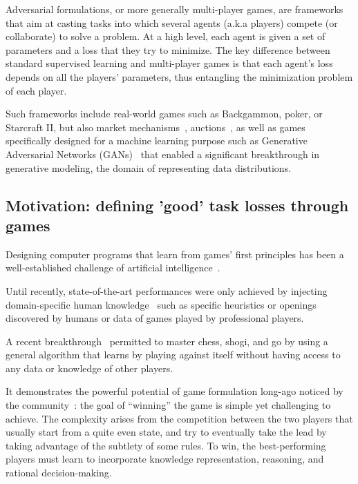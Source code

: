Adversarial formulations, or more generally multi-player games, are frameworks that aim at casting tasks into which several agents (a.k.a players) compete (or collaborate) to solve a problem. At a high level, each agent is given a set of parameters and a loss that they try to minimize. The key difference between standard supervised learning and multi-player games is that each agent’s loss depends on all the players' parameters, thus entangling the minimization problem of each player. 







Such frameworks include real-world games such as Backgammon, poker, or Starcraft II, but also market mechanisms~\citep{nisan2007introduction}, auctions~\citep{vickrey1961counterspeculation}, as well as games specifically designed for a machine learning purpose such as Generative Adversarial Networks (GANs)~\citep{goodfellow2014generative} that enabled a significant breakthrough in generative modeling, the domain of representing data distributions.







\subsection{Motivation: defining ’good’ task losses through games}




Designing computer programs that learn from games' first principles has been a well-established challenge of artificial intelligence~\citep{samuel1959some,tesauro1995temporal}.

Until recently, state-of-the-art performances were only achieved by injecting domain-specific human knowledge~\citep{campbell2002deep,genesereth2005general,silver2016mastering} such as specific heuristics or openings discovered by humans or data of games played by professional players. 




A recent breakthrough~\citep{silver2018general} permitted to master chess, shogi, and go by using a general algorithm that learns by playing against itself without having access to any data or knowledge of other players. 




It demonstrates the powerful potential of game formulation long-ago noticed by the community~\citep{genesereth2005general}: the goal of ``winning'' the game is simple yet challenging to achieve. The complexity arises from the competition between the two players that usually start from a quite even state, and try to eventually take the lead by taking advantage of the subtlety of some rules. To win, the best-performing players must learn to incorporate knowledge representation, reasoning, and rational decision-making.




